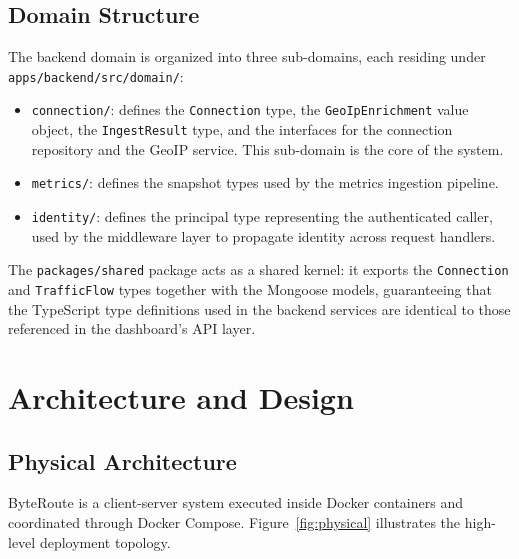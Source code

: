 \documentclass[12pt]{report}
\begin{document}
\FloatBarrier

\section{Domain Structure}

The backend domain is organized into three sub-domains, each residing under
\texttt{apps/backend/src/domain/}:

\begin{itemize}
  \item \texttt{connection/}: defines the \texttt{Connection} type, the
    \texttt{GeoIpEnrichment} value object, the \texttt{IngestResult} type, and
    the interfaces for the connection repository and the GeoIP service. This
    sub-domain is the core of the system.
  \item \texttt{metrics/}: defines the snapshot types used by the metrics
    ingestion pipeline.
  \item \texttt{identity/}: defines the principal type representing the
    authenticated caller, used by the middleware layer to propagate identity
    across request handlers.
\end{itemize}

The \texttt{packages/shared} package acts as a shared kernel: it exports the
\texttt{Connection} and \texttt{TrafficFlow} types together with the Mongoose
models, guaranteeing that the TypeScript type definitions used in the backend
services are identical to those referenced in the dashboard's API layer.

\chapter{Architecture and Design}
\label{chap:architecture}

\section{Physical Architecture}

ByteRoute is a client-server system executed inside Docker containers and
coordinated through Docker Compose. Figure~\ref{fig:physical} illustrates the
high-level deployment topology.
\end{document}
